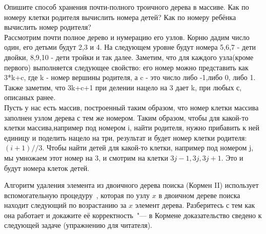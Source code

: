 \documentclass[12pt]{extreport}
\theoremstyle{definiton}
\theoremstyle{definition}
\theoremstyle{definition}
\begin{document}
			\Pr[2] Опишите способ хранения почти-полного троичного дерева в массиве. Как по номеру клетки родителя вычислить номера детей? Как по номеру ребёнка вычислить номер родителя?
			\newline
			\\ Рассмотрим почти полное дерево и нумерацию его узлов. Корню дадим число один, его детьми будут 2,3 и 4. На следующем уровне будут номера 5,6,7 - дети двойки, 8,9,10 - дети тройки и так далее. Заметим, что для каждого узла(кроме первого) выполняется следующее свойство: его номер можно представить как 3*k+c, где k - номер вершины родителя, а c - это число либо -1,либо 0, либо 1. Также заметим, что 3k+c+1 при делении нацело на 3 дает k, при любых с, описаных ранее.
			\\ Пусть у нас есть массив, построенный таким образом, что номер клетки массива заполнен узлом дерева с тем же номером. Таким образом, чтобы для какой-то клетки массива,например под номером i, найти родителя, нужно прибавить к ней единицу и поделить нацело на три, результат и будет номер клетки родителя: $(i+1) // 3$. Чтобы найти детей для какой-то клетки, например под номером j, мы умножаем этот номер на 3, и смотрим на клетки $3j-1,3j,3j+1$. Это и будут номера клеток детей.

			\medskip

			 Алгоритм удаления элемента из двоичного дерева поиска (Кормен II) использует вспомогательную процедуру~\TreeSuccessor, которая по узлу $x$ в двоичном дереве поиска находит следующий по возрастанию за $x$ элемент дерева. Разберитесь с тем как она работает и докажите её корректность~"--- в Кормене доказательство сведено к следующей задаче (упражнению для читателя). %
\end{document}
